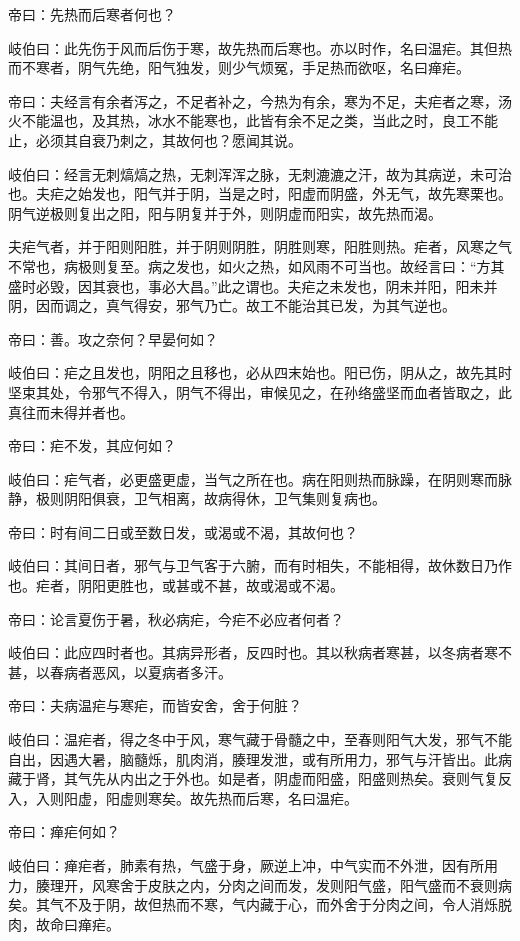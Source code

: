 \documentclass{article}%
\begin{document}
帝曰：先热而后寒者何也？

岐伯曰：此先伤于风而后伤于寒，故先热而后寒也。亦以时作，名曰温疟。其但热而不寒者，阴气先绝，阳气独发，则少气烦冤，手足热而欲呕，名曰瘅疟。

帝曰：夫经言有余者泻之，不足者补之，今热为有余，寒为不足，夫疟者之寒，汤火不能温也，及其热，冰水不能寒也，此皆有余不足之类，当此之时，良工不能止，必须其自衰乃刺之，其故何也？愿闻其说。

岐伯曰：经言无刺熇熇之热，无刺浑浑之脉，无刺漉漉之汗，故为其病逆，未可治也。夫疟之始发也，阳气并于阴，当是之时，阳虚而阴盛，外无气，故先寒栗也。阴气逆极则复出之阳，阳与阴复并于外，则阴虚而阳实，故先热而渴。

夫疟气者，并于阳则阳胜，并于阴则阴胜，阴胜则寒，阳胜则热。疟者，风寒之气不常也，病极则复至。病之发也，如火之热，如风雨不可当也。故经言曰：“方其盛时必毁，因其衰也，事必大昌。”此之谓也。夫疟之未发也，阴未并阳，阳未并阴，因而调之，真气得安，邪气乃亡。故工不能治其已发，为其气逆也。

帝曰：善。攻之奈何？早晏何如？

岐伯曰：疟之且发也，阴阳之且移也，必从四末始也。阳已伤，阴从之，故先其时坚束其处，令邪气不得入，阴气不得出，审候见之，在孙络盛坚而血者皆取之，此真往而未得并者也。

帝曰：疟不发，其应何如？

岐伯曰：疟气者，必更盛更虚，当气之所在也。病在阳则热而脉躁，在阴则寒而脉静，极则阴阳俱衰，卫气相离，故病得休，卫气集则复病也。

帝曰：时有间二日或至数日发，或渴或不渴，其故何也？

岐伯曰：其间日者，邪气与卫气客于六腑，而有时相失，不能相得，故休数日乃作也。疟者，阴阳更胜也，或甚或不甚，故或渴或不渴。

帝曰：论言夏伤于暑，秋必病疟，今疟不必应者何者？

岐伯曰：此应四时者也。其病异形者，反四时也。其以秋病者寒甚，以冬病者寒不甚，以春病者恶风，以夏病者多汗。

帝曰：夫病温疟与寒疟，而皆安舍，舍于何脏？

岐伯曰：温疟者，得之冬中于风，寒气藏于骨髓之中，至春则阳气大发，邪气不能自出，因遇大暑，脑髓烁，肌肉消，腠理发泄，或有所用力，邪气与汗皆出。此病藏于肾，其气先从内出之于外也。如是者，阴虚而阳盛，阳盛则热矣。衰则气复反入，入则阳虚，阳虚则寒矣。故先热而后寒，名曰温疟。

帝曰：瘅疟何如？

岐伯曰：瘅疟者，肺素有热，气盛于身，厥逆上冲，中气实而不外泄，因有所用力，腠理开，风寒舍于皮肤之内，分肉之间而发，发则阳气盛，阳气盛而不衰则病矣。其气不及于阴，故但热而不寒，气内藏于心，而外舍于分肉之间，令人消烁脱肉，故命曰瘅疟。
\end{document}
